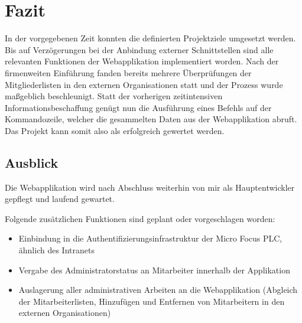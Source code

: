 \section{Fazit}
\label{sec:Fazit}
In der vorgegebenen Zeit konnten die definierten Projektziele umgesetzt werden. Bis auf
Verzögerungen bei der Anbindung externer Schnittstellen sind alle relevanten Funktionen der
Webapplikation implementiert worden.
Nach der firmenweiten Einführung fanden bereits mehrere Überprüfungen der Mitgliederlisten in den
externen Organisationen statt und der Prozess wurde maßgeblich beschleunigt. Statt der vorherigen
zeitintensiven Informationsbeschaffung genügt nun die Ausführung eines Befehls auf der Kommandozeile,
welcher die gesammelten Daten aus der Webapplikation abruft. Das Projekt kann somit also als
erfolgreich gewertet werden.

\subsection{Ausblick}
\label{sec:Ausblick}
Die Webapplikation wird nach Abschluss weiterhin von mir als Hauptentwickler gepflegt und laufend
gewartet.

Folgende zusätzlichen Funktionen sind geplant oder vorgeschlagen worden:
\begin{itemize}
  \item Einbindung in die Authentifizierungsinfrastruktur der Micro Focus PLC, ähnlich des
  Intranets
  \item Vergabe des Administratorstatus an Mitarbeiter innerhalb der Applikation
  \item Auslagerung aller administrativen Arbeiten an die Webapplikation (Abgleich der
  Mitarbeiterlisten, Hinzufügen und Entfernen von Mitarbeitern in den externen Organisationen)
\end{itemize}
